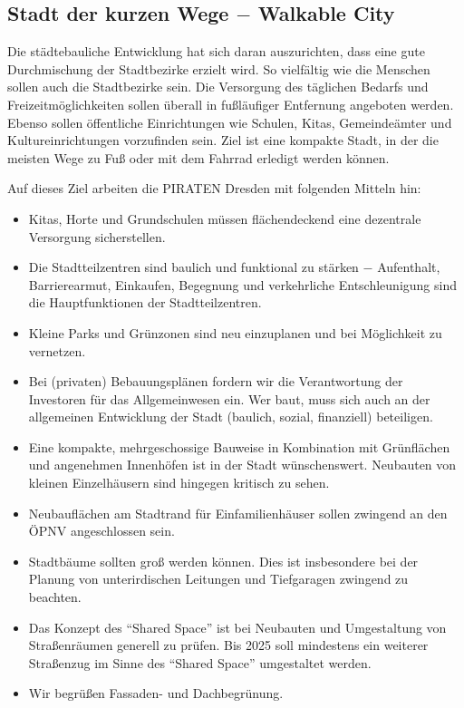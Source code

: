 \documentclass[a4paper, 11pt]{article}
\begin{document}
\subsection{Stadt der kurzen Wege $-$ Walkable City}
Die städtebauliche Entwicklung hat sich daran auszurichten, dass eine gute Durchmischung der Stadtbezirke erzielt wird. So vielfältig wie die Menschen sollen auch die Stadtbezirke sein. Die Versorgung des täglichen Bedarfs und Freizeitmöglichkeiten sollen überall in fußläufiger Entfernung angeboten werden. Ebenso sollen öffentliche Einrichtungen wie Schulen, Kitas, Gemeindeämter und Kultureinrichtungen vorzufinden sein. Ziel ist eine kompakte Stadt, in der die meisten Wege zu Fuß oder mit dem Fahrrad erledigt werden können.\newline

Auf dieses Ziel arbeiten die PIRATEN Dresden mit folgenden Mitteln hin:

\begin{itemize}
    \item Kitas, Horte und Grundschulen müssen flächendeckend eine dezentrale Versorgung sicherstellen.
    \item Die Stadtteilzentren sind baulich und funktional zu stärken $-$ Aufenthalt, Barrierearmut, Einkaufen, Begegnung und verkehrliche Entschleunigung sind die Hauptfunktionen der Stadtteilzentren.
    \item Kleine Parks und Grünzonen sind neu einzuplanen und bei Möglichkeit zu vernetzen.
    \item Bei (privaten) Bebauungsplänen fordern wir die Verantwortung der Investoren für das Allgemeinwesen ein. Wer baut, muss sich auch an der allgemeinen Entwicklung der Stadt (baulich, sozial, finanziell) beteiligen.
    \item Eine kompakte, mehrgeschossige Bauweise in Kombination mit Grünflächen und angenehmen Innenhöfen ist in der Stadt wünschenswert. Neubauten von kleinen Einzelhäusern sind hingegen kritisch zu sehen.
    \item Neubauflächen am Stadtrand für Einfamilienhäuser sollen zwingend an den ÖPNV angeschlossen sein.
    \item Stadtbäume sollten groß werden können. Dies ist insbesondere bei der Planung von unterirdischen Leitungen und Tiefgaragen zwingend zu beachten.
    \item Das Konzept des ``Shared Space'' ist bei Neubauten und Umgestaltung von Straßenräumen generell zu prüfen. Bis 2025 soll mindestens ein weiterer Straßenzug im Sinne des ``Shared Space'' umgestaltet werden.
    \item Wir begrüßen Fassaden- und Dachbegrünung.
\end{itemize}
\end{document}
